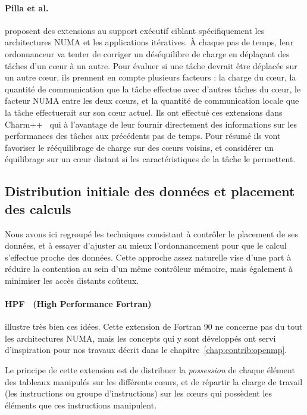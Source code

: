 \paragraph{Pilla et al.~\cite{Pilla2014}} proposent des extensions au support exécutif ciblant spécifiquement les architectures NUMA et les applications itératives.
À chaque pas de temps, leur ordonnanceur va tenter de corriger un déséquilibre de charge en déplaçant des tâches d'un cœur à un autre.
Pour évaluer si une tâche devrait être déplacée sur un autre cœur, ils prennent en compte plusieurs facteurs : la charge du cœur, la quantité de communication que la tâche effectue avec d'autres tâches du cœur, le facteur NUMA entre les deux cœurs, et la quantité de communication locale que la tâche effectuerait sur son cœur actuel.
Ils ont effectué ces extensions dans Charm++~\cite{Kale1993} qui à l'avantage de leur fournir directement des informations sur les performances des tâches aux précédents pas de temps.
Pour résumé ils vont favoriser le rééquilibrage de charge sur des cœurs voisins, et considérer un équilibrage sur un cœur distant si les caractéristiques de la tâche le permettent.


\subsection{Distribution initiale des données et placement des calculs}

Nous avons ici regroupé les techniques consistant à contrôler le placement de ses données, et à essayer d'ajuster au mieux l'ordonnancement pour que le calcul s'effectue proche des données.
Cette approche assez naturelle vise d'une part à réduire la contention au sein d'un même contrôleur mémoire, mais également à minimiser les accès distants coûteux.

\paragraph{HPF~\cite{HPF} (High Performance Fortran)} illustre très bien ces idées.
Cette extension de Fortran 90 ne concerne pas du tout les architectures NUMA, mais les concepts qui y sont développés ont servi d'inspiration pour nos travaux décrit dans le chapitre~\ref{chap:contrib:openmp}.

Le principe de cette extension est de distribuer la \emph{possession} de chaque élément des tableaux manipulés sur les différents cœurs, et de répartir la charge de travail (les instructions ou groupe d'instructions) sur les cœurs qui possèdent les éléments que ces instructions manipulent.

